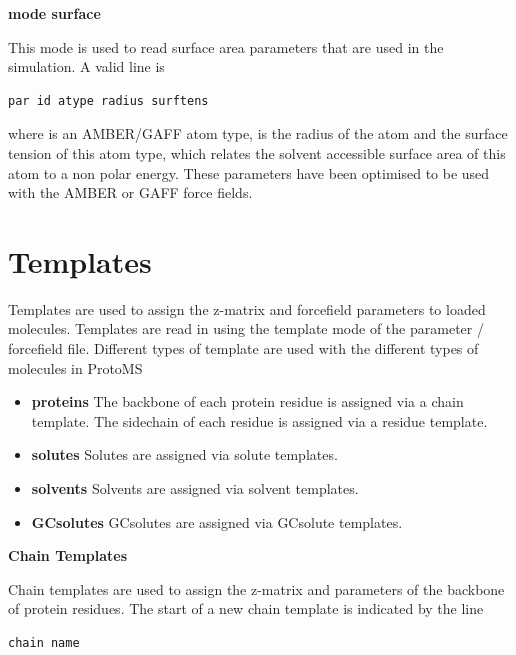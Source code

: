 \documentclass[letterpaper,10pt,english]{sphinxmanual}
\begin{document}
\textbf{mode surface}

This mode is used to read surface area parameters that are used in the simulation. A valid line is

\begin{Verbatim}[commandchars=\\\{\}]
par id atype radius surftens
\end{Verbatim}

where  is an AMBER/GAFF atom type,  is the radius of the atom and  the surface tension of this atom type, which relates the solvent accessible surface area of this atom to a non polar energy. These parameters have been optimised to be used with the AMBER or GAFF force fields.


\section{Templates}
\label{protoms:templates}\label{protoms:temref}
Templates are used to assign the z-matrix and forcefield parameters to loaded molecules. Templates are read in using the template mode of the parameter / forcefield file. Different types of template are used with the different types of molecules in ProtoMS
\begin{itemize}
\item {} 
\textbf{proteins} The backbone of each protein residue is assigned via a chain template. The sidechain of each residue is assigned via a residue template.

\item {} 
\textbf{solutes} Solutes are assigned via solute templates.

\item {} 
\textbf{solvents} Solvents are assigned via solvent templates.

\item {} 
\textbf{GCsolutes} GCsolutes are assigned via GCsolute templates.

\end{itemize}

\textbf{Chain Templates}

Chain templates are used to assign the z-matrix and parameters of the backbone of protein residues. The start of a new chain template is indicated by the line

\begin{Verbatim}[commandchars=\\\{\}]
chain name
\end{Verbatim}
\end{document}
